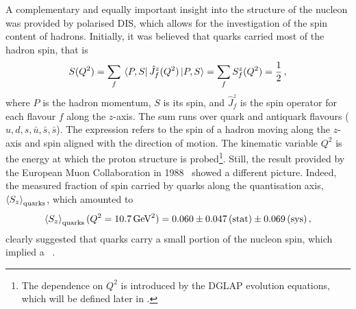A complementary and equally important insight into the structure of the nucleon was provided by polarised DIS, which allows for the investigation of the spin content of hadrons. Initially, it was believed that quarks carried most of the hadron spin, that is
\begin{equation}
  S(Q^2) = \sum_{f} \bra*{P,S} \hat{J}_f^z(Q^2) \ket*{P,S} = \sum_f S^z_f (Q^2) = \frac{1}{2} \,,
  \label{eq:S(Q2)}
\end{equation}
%
where $P$ is the hadron momentum, $S$ is its spin, and $\hat{J}_f^z$ is the spin operator for each flavour $f$ along the $z$-axis. The sum runs over quark and antiquark flavours ($u,d,s,\bar{u}, \bar{s}, \bar{s}$). The expression refers to the spin of a hadron moving along the $z$-axis and spin aligned with the direction of motion. The kinematic variable $Q^2$ is the energy at which the proton structure is probed\footnote{\footnotesize The dependence on $Q^2$ is introduced by the DGLAP evolution equations, which will be defined later in .}. Still, the result provided by the European Muon Collaboration in 1988~\cite{EuropeanMuon:1989yki} showed a different picture. Indeed, the measured fraction of spin carried by quarks along the quantisation axis, $\left< S_z \right>_{\textrm{quarks}}$, which amounted to
\begin{equation}
  \left< S_z \right>_{\textrm{quarks}} (Q^2 = 10.7 \, \textrm{GeV}^2) = 0.060 \pm 0.047 \, (\textrm{stat}) \pm 0.069 \, (\textrm{sys}) \,,
  \label{eq:EIC_spin}
\end{equation}
clearly suggested that quarks carry a small portion of the nucleon spin, which implied a ~\cite{Leader_Anselmino}.%

